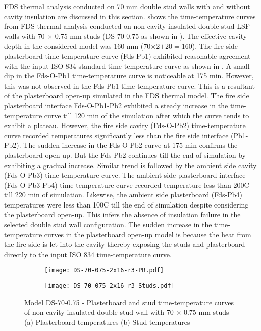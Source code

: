 FDS thermal analysis conducted on 70 mm double stud walls with and without cavity insulation are discussed in this section.  shows the time-temperature curves from FDS thermal analysis conducted on non-cavity insulated double stud LSF walls with 70 $\times$ 0.75 mm studs (DS-70-0.75 as shown in ). The effective cavity depth in the considered model was 160 mm (70$\times$2$+$20$=$160). The fire side plasterboard time-temperature curve (Fds-Pb1) exhibited reasonable agreement with the input ISO 834 standard time-temperature curve as shown in . A small dip in the Fds-O-Pb1 time-temperature curve is noticeable at 175 min. However, this was not observed in the Fds-Pb1 time-temperature curve. This is a resultant of the plasterboard open-up simulated in the FDS thermal model. The fire side plasterboard interface Fds-O-Pb1-Pb2 exhibited a steady increase in the time-temperature curve till 120 min of the simulation after which the curve tends to exhibit a plateau. However, the fire side cavity (Fds-O-Pb2) time-temperature curve recorded temperatures significantly less than the fire side interface (Pb1-Pb2). The sudden increase in the Fds-O-Pb2 curve at 175 min confirms the plasterboard open-up. But the Fds-Pb2 continues till the end of simulation by exhibiting a gradual increase. Similar trend is followed by the ambient side cavity (Fds-O-Pb3) time-temperature curve. The ambient side plasterboard interface (Fds-O-Pb3-Pb4) time-temperature curve recorded temperature less than 200\degree C till 220 min of simulation. Likewise, the ambient side plasterboard (Fds-Pb4) temperatures were less than 100\degree C till the end of simulation despite considering the plasterboard open-up. This infers the absence of insulation failure in the selected double stud wall configuration. The sudden increase in the time-temperature curves in the plasterboard open-up model is because the heat from the fire side is let into the cavity thereby exposing the studs and plasterboard directly to the input ISO 834 time-temperature curve.
\begin{figure}[!htbp]
	\centering
	\begin{subfigure}[b]{0.6\textwidth}
		\centering
		\texttt{[image: DS-70-075-2x16-r3-PB.pdf]}
		\caption{}
		\label{subfig:DS-70-075-2x16-r3-PB}
	\end{subfigure}
	\begin{subfigure}[b]{0.6\textwidth}
		\centering
		\texttt{[image: DS-70-075-2x16-r3-Studs.pdf]}
		\caption{}
		\label{subfig:DS-70-075-2x16-r3-Studs}
	\end{subfigure}
	   \caption{Model DS-70-0.75 - Plasterboard and stud time-temperature curves of non-cavity insulated double stud wall with 70 $\times$ 0.75 mm studs - (a) Plasterboard temperatures (b) Stud temperatures}
	   \label{fig:DS-70-075-2x16-r3}
\end{figure} 

